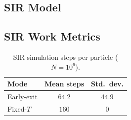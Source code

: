 \documentclass[conference]{IEEEtran}
\begin{document}
\subsection{SIR Model}

\begin{table}[H]
\caption{SIR model: sequential performance (early-exit mode).}
\label{tab:sir_early_performance}
\centering
{}
\end{table}

\begin{table}[H]
\caption{SIR model: sequential performance (fixed-$T$ mode).}
\label{tab:sir_fixed_performance}
\centering
{}
\end{table}

\subsection{SIR Work Metrics}

\begin{table}[H]
\caption{SIR simulation steps per particle ($N = 10^6$).}
\label{tab:sir_steps}
\centering
\begin{tabular}{lcc}
\toprule
Mode & Mean steps & Std.\ dev. \\
\midrule
Early-exit & $64.2$ & $44.9$ \\
Fixed-$T$ & $160$ & $0$ \\
\bottomrule
\end{tabular}
\end{table}
\end{document}

